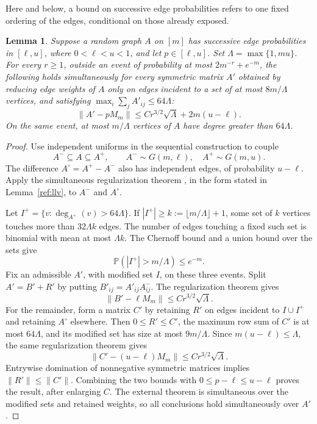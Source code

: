 \documentclass[11pt]{article}
\def\P{\mathbb{P}}
\newtheorem{lemma}[thm]{Lemma}
\numberwithin{equation}{section}
\begin{document}
Here and below, a bound on successive edge probabilities refers to one fixed ordering of the edges, conditional on those already exposed.

\begin{lemma}\label{tp:spectral}
Suppose a random graph $A$ on $[m]$ has successive edge probabilities in $[\ell,u]$, where $0<\ell<u<1$, and let $p\in[\ell,u]$. Set $\Lambda=\max\{1,mu\}$. For every $r\ge1$, outside an event of probability at most $2m^{-r}+e^{-m}$, the following holds simultaneously for every symmetric matrix $A'$ obtained by reducing edge weights of $A$ only on edges incident to a set of at most $8m/\Lambda$ vertices, and satisfying $\max_i\sum_jA'_{ij}\le64\Lambda$:
\[
 \|A'-pM_m\|\le C r^{3/2}\sqrt\Lambda+2m(u-\ell).
\]
On the same event, at most $m/\Lambda$ vertices of $A$ have degree greater than $64\Lambda$.
\end{lemma}
\begin{proof}
Use independent uniforms in the sequential construction to couple
\[
 A^-\subseteq A\subseteq A^+,
 \qquad A^-\sim G(m,\ell),\quad A^+\sim G(m,u).
\]
The difference $A^\circ=A^+-A^-$ also has independent edges, of probability $u-\ell$. Apply the simultaneous regularization theorem \cite[Theorem~2.1]{LLV17}, in the form stated in Lemma~\ref{ref:llv}, to $A^-$ and $A^\circ$.

Let $I^+=\{v:\deg_{A^+}(v)>64\Lambda\}$. If $|I^+|\ge k:=\lfloor m/\Lambda\rfloor+1$, some set of $k$ vertices touches more than $32\Lambda k$ edges. The number of edges touching a fixed such set is binomial with mean at most $\Lambda k$. The Chernoff bound and a union bound over the sets give
\[
 \P(|I^+|>m/\Lambda)\le e^{-m}.
\]
Fix an admissible $A'$, with modified set $I$, on these three events. Split $A'=B'+R'$ by putting $B'_{ij}=A'_{ij}A^-_{ij}$. The regularization theorem gives
\[
 \|B'-\ell M_m\|\le C r^{3/2}\sqrt\Lambda.
\]
For the remainder, form a matrix $C'$ by retaining $R'$ on edges incident to $I\cup I^+$ and retaining $A^\circ$ elsewhere. Then $0\le R'\le C'$, the maximum row sum of $C'$ is at most $64\Lambda$, and its modified set has size at most $9m/\Lambda$. Since $m(u-\ell)\le\Lambda$, the same regularization theorem gives
\[
 \|C'-(u-\ell)M_m\|\le C r^{3/2}\sqrt\Lambda.
\]
Entrywise domination of nonnegative symmetric matrices implies $\|R'\|\le\|C'\|$. Combining the two bounds with $0\le p-\ell\le u-\ell$ proves the result, after enlarging $C$. The external theorem is simultaneous over the modified sets and retained weights, so all conclusions hold simultaneously over $A'$.
\end{proof}
\end{document}
